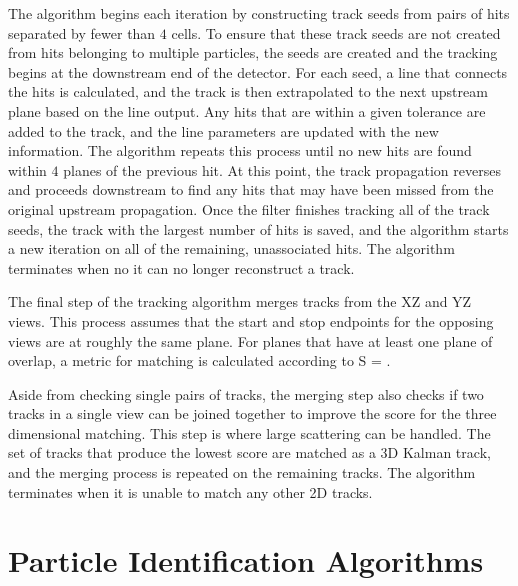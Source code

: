 The algorithm begins each iteration by constructing track seeds from pairs of hits separated by fewer than $4$ cells. To ensure that these track seeds are not created from hits belonging to multiple particles, the seeds are created and the tracking begins at the downstream end of the detector. For each seed, a line that connects the hits is calculated, and the track is then extrapolated to the next upstream plane based on the line output. Any hits that are within a given tolerance are added to the track, and the line parameters are updated with the new information. The algorithm repeats this process until no new hits are found within $4$ planes of the previous hit. At this point, the track propagation reverses and proceeds downstream to find any hits that may have been missed from the original upstream propagation. Once the filter finishes tracking all of the track seeds, the track with the largest number of hits is saved, and the algorithm starts a new iteration on all of the remaining, unassociated hits. The algorithm terminates when no it can no longer reconstruct a track.

The final step of the tracking algorithm merges tracks from the XZ and YZ views. This process assumes that the start and stop endpoints for the opposing views are at roughly the same plane. For planes that have at least one plane of overlap, a metric for matching is calculated according to
\beq
S = .
\label{eq:KalmanMerge}
\eeq

\n Aside from checking single pairs of tracks, the merging step also checks if two tracks in a single view can be joined together to improve the score for the three dimensional matching. This step is where large scattering can be handled. The set of tracks that produce the lowest score are matched as a 3D Kalman track, and the merging process is repeated on the remaining tracks. The algorithm terminates when it is unable to match any other 2D tracks.

\section{Particle Identification Algorithms}

